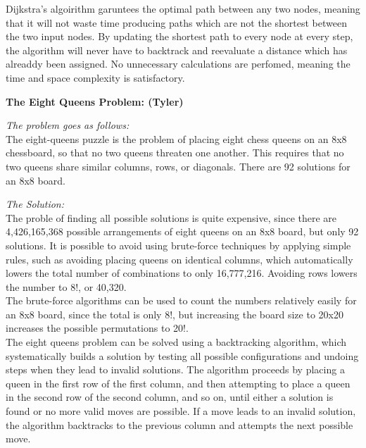 \documentclass{article}
\begin{document}
Dijkstra's algoirithm garuntees the optimal path between any two nodes, meaning 
that it will not waste time producing paths which are not the shortest between
the two input nodes. By updating the shortest path to every node at every step, 
the algorithm will never have to backtrack and reevaluate a distance which
has alreaddy been assigned. No unnecessary calculations are perfomed, meaning 
the time and space complexity is satisfactory.

\noindent \textbf{The Eight Queens Problem: (Tyler)} 

\noindent \textit{The problem goes as follows:} \\

The eight-queens puzzle is the problem of placing eight chess queens on an 8x8
chessboard, so that no two queens threaten one another. This requires that no two
queens share similar columns, rows, or diagonals. There are 92 solutions for an
8x8 board.


\medskip

\noindent \textit{The Solution:} \\

The proble of finding all possible solutions is quite expensive, since there are
4,426,165,368 possible arrangements of eight queens on an 8x8 board, but only
92 solutions. It is possible to avoid using brute-force techniques by applying simple rules,
such as avoiding placing queens on identical columns, which automatically lowers the
total number of combinations to only 16,777,216. Avoiding rows lowers the number to
8!, or 40,320.\\

The brute-force algorithms can be used to count the numbers relatively easily for an
8x8 board, since the total is only 8!, but increasing the board size to 20x20 increases
the possible permutations to 20!.\\

The eight queens problem can be solved using a backtracking algorithm, which
systematically builds a solution by testing all possible configurations and undoing steps
when they lead to invalid solutions. The algorithm proceeds by placing a queen in the
first row of the first column, and then attempting to place a queen in the second row of
the second column, and so on, until either a solution is found or no more valid moves are
possible. If a move leads to an invalid solution, the algorithm backtracks to the previous
column and attempts the next possible move.\\
\end{document}
